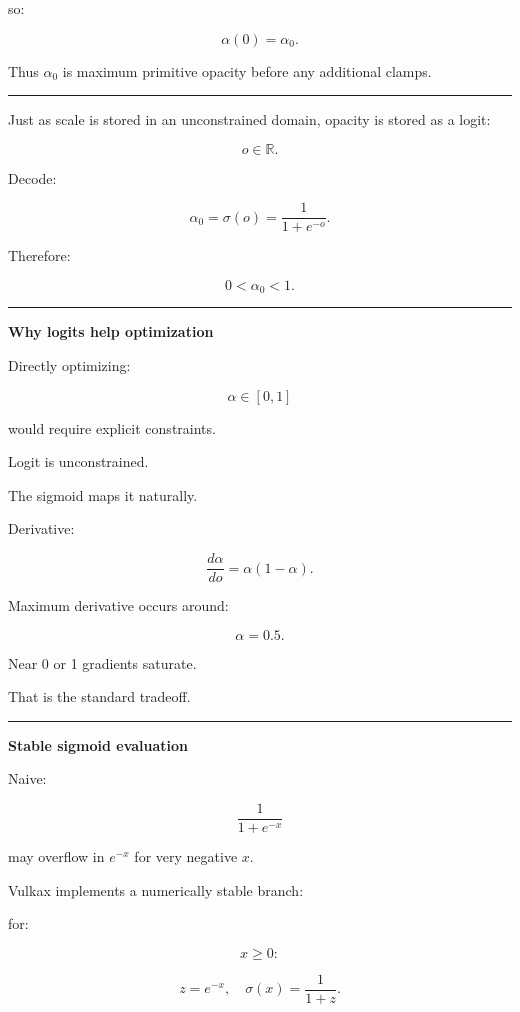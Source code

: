 so:

\[
\alpha(0)=\alpha_0.
\]

Thus \(\alpha_0\) is maximum primitive opacity before any additional clamps.

\begin{center}\rule{0.5\linewidth}{0.5pt}\end{center}

Just as scale is stored in an unconstrained domain, opacity is stored as a logit:

\[
o\in\mathbb R.
\]

Decode:

\[
\boxed{
\alpha_0
=
\sigma(o)
=
\frac1{1+e^{-o}}.
}
\]

Therefore:

\[
0<\alpha_0<1.
\]

\begin{center}\rule{0.5\linewidth}{0.5pt}\end{center}

\textbf{Why logits help optimization}

Directly optimizing:

\[
\alpha\in[0,1]
\]

would require explicit constraints.

Logit is unconstrained.

The sigmoid maps it naturally.

Derivative:

\[
\boxed{
\frac{d\alpha}{do}
=
\alpha(1-\alpha).
}
\]

Maximum derivative occurs around:

\[
\alpha=0.5.
\]

Near 0 or 1 gradients saturate.

That is the standard tradeoff.

\begin{center}\rule{0.5\linewidth}{0.5pt}\end{center}

\textbf{Stable sigmoid evaluation}

Naive:

\[
\frac1{1+e^{-x}}
\]

may overflow in \(e^{-x}\) for very negative \(x\).

Vulkax implements a numerically stable branch:

for:

\[
x\ge0:
\]

\[
z=e^{-x},
\quad
\sigma(x)=\frac1{1+z}.
\]

